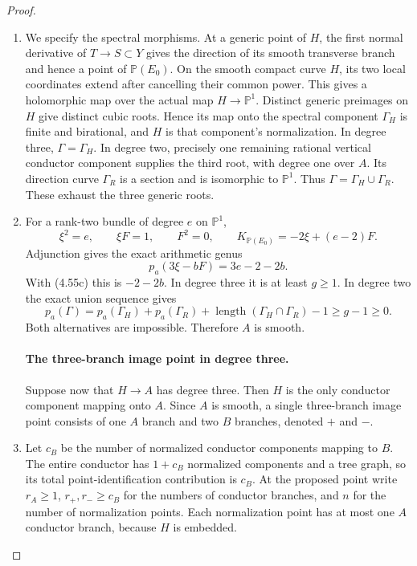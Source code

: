 \begin{proof}
\begin{enumerate}[label={$\langle1\rangle$\arabic*.},leftmargin=*]
\item We specify the spectral morphisms. At a generic point of
$H$, the first normal derivative of $T\to S\subset Y$
gives the direction of its smooth transverse branch and
hence a point of $\mathbb P(E_0)$. On the smooth compact
curve $H$, its two local coordinates extend after cancelling
their common power. This gives a holomorphic map over the
actual map $H\to\mathbb P^1$. Distinct generic preimages
on $H$ give distinct cubic roots. Hence its map onto the
spectral component $\Gamma_H$ is finite and birational,
and $H$ is that component's normalization. In degree three,
$\Gamma=\Gamma_H$. In degree two, precisely one remaining
rational vertical conductor component supplies the third
root, with degree one over $A$. Its direction curve
$\Gamma_R$ is a section and is isomorphic to $\mathbb P^1$.
Thus $\Gamma=\Gamma_H\cup\Gamma_R$. These exhaust the
three generic roots.

\item For a rank-two bundle of degree $e$ on $\mathbb P^1$,
\[
 \xi^2=e,\qquad \xi F=1,\qquad F^2=0,\qquad
 K_{\mathbb P(E_0)}=-2\xi+(e-2)F.
\]
Adjunction gives the exact arithmetic genus
\[
                    p_a(3\xi-bF)=3e-2-2b.               \tag{4.55d}
\]
With (4.55c) this is $-2-2b$. In degree three it is at
least $g\ge1$. In degree two the exact union sequence gives
\[
 p_a(\Gamma)=p_a(\Gamma_H)+p_a(\Gamma_R)
           +\operatorname{length}(\Gamma_H\cap\Gamma_R)-1
       \ge g-1\ge0.
\]
Both alternatives are impossible. Therefore $A$ is smooth.

\paragraph{The three-branch image point in degree three.}
Suppose now that $H\to A$ has degree three. Then $H$ is
the only conductor component mapping onto $A$. Since $A$
is smooth, a single three-branch image point consists of
one $A$ branch and two $B$ branches, denoted $+$ and $-$.

\item Let $c_B$ be the number of normalized conductor components
mapping to $B$. The entire conductor has $1+c_B$
normalized components and a tree graph, so its total
point-identification contribution is $c_B$. At the proposed
point write $r_A\ge1$, $r_+,r_-\ge c_B$ for the numbers
of conductor branches, and $n$ for the number of normalization
points. Each normalization point has at most one $A$
conductor branch, because $H$ is embedded.


\end{enumerate}
\end{proof}
